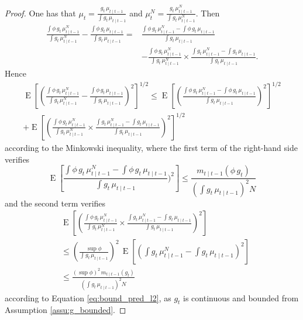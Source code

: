 \documentclass{article}
\DeclareMathOperator{\E}{E}
\begin{document}
\begin{proof}
    One has that $\displaystyle \mu_t = \frac{g_t \, \mu_{t \mid t-1}}{\int g_t \, \mu_{t \mid t-1}}$ and $\displaystyle \mu^N_t = \frac{g_t \, \mu^N_{t \mid t-1}}{\int g_t \, \mu^N_{t \mid t-1}}$. Then
    \begin{align*}
        \frac{\int \phi \, g_t \, \mu^N_{t \mid t-1}}{\int g_t \, \mu^N_{t \mid t-1}} - \frac{\int \phi \, g_t \, \mu_{t \mid t-1}}{\int g_t \, \mu_{t \mid t-1}}
        = & \frac{\int \phi \, g_t \, \mu^N_{t \mid t-1} - \int \phi \, g_t \, \mu_{t \mid t-1}}{\int g_t \, \mu_{t \mid t-1}} \\
        & - \frac{\int \phi \, g_t \, \mu^N_{t \mid t-1}}{\int g_t \, \mu^N_{t \mid t-1}} \times \frac{\int g_t \, \mu^N_{t \mid t-1} - \int g_t \, \mu_{t \mid t-1}}{\int g_t \, \mu_{t \mid t-1}}.
    \end{align*}
    Hence
    \begin{multline*}
        \E[(\frac{\int \phi \, g_t \, \mu^N_{t \mid t-1}}{\int g_t \, \mu^N_{t \mid t-1}} - \frac{\int \phi \, g_t \, \mu_{t \mid t-1}}{\int g_t \, \mu_{t \mid t-1}})^2]^{1/2} \leq \E[(\frac{\int \phi \, g_t \, \mu^N_{t \mid t-1} - \int \phi \, g_t \, \mu_{t \mid t-1}}{\int g_t \, \mu_{t \mid t-1}})^2]^{1/2} \\
        + \E[(\frac{\int \phi \, g_t \, \mu^N_{t \mid t-1}}{\int g_t \, \mu^N_{t \mid t-1}} \times \frac{\int g_t \, \mu^N_{t \mid t-1} - \int g_t \, \mu_{t \mid t-1}}{\int g_t \, \mu_{t \mid t-1}})^2]^{1/2}
    \end{multline*}
    according to the Minkowski inequality, where the first term of the right-hand side verifies
    \begin{equation*}
        \E[\frac{\int \phi \, g_t \, \mu^N_{t \mid t-1} - \int \phi \, g_t \, \mu_{t \mid t-1}}{\int g_t \, \mu_{t \mid t-1}})^2] \leq \frac{m_{t \mid t-1}(\phi \, g_t)}{(\int g_t \, \mu_{t \mid t-1})^2 N}
    \end{equation*}
    and the second term verifies
    \begin{align*}
        & \E[(\frac{\int \phi \, g_t \, \mu^N_{t \mid t-1}}{\int g_t \, \mu^N_{t \mid t-1}} \times \frac{\int g_t \, \mu^N_{t \mid t-1} - \int g_t \, \mu_{t \mid t-1}}{\int g_t \, \mu_{t \mid t-1}})^2] \\
        & \leq (\frac{\sup \phi}{\int g_t \, \mu_{t \mid t-1}})^2 \, \E[(\int g_t \, \mu^N_{t \mid t-1} - \int g_t \, \mu_{t \mid t-1})^2] \\
        & \leq \frac{(\sup \phi)^2 \, m_{t \mid t-1}(g_t)}{(\int g_t \, \mu_{t \mid t-1})^2 N}
    \end{align*}
    according to Equation \eqref{eq:bound_pred_l2}, as $g_t$ is continuous and bounded from Assumption \ref{assu:g_bounded}.
\end{proof}
\end{document}
